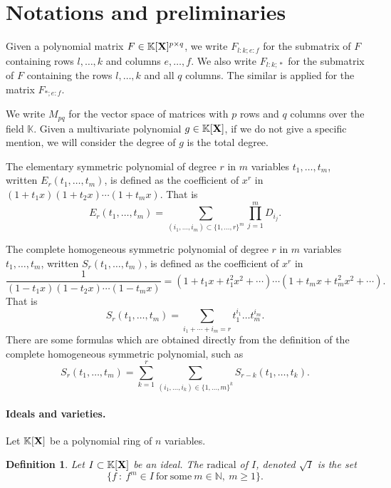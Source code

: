 \documentclass[11pt]{article}
\numberwithin{Property}{section}
\numberwithin{Theorem}{section}
\numberwithin{Proposition}{section}
\numberwithin{Lemma}{section}
\numberwithin{Corollary}{section}
\newtheorem{Definition}{Definition}%
\numberwithin{Definition}{section}
\numberwithin{Remark}{section}
\numberwithin{Conjecture}{section}
\numberwithin{Problem}{section}
\numberwithin{Claim}{section}
\theoremstyle{definition}
\numberwithin{Example}{section}
\renewcommand{\geq}{\geqslant}
\newcommand{\field}{\mathbb{K}} %
\newcommand{\mat}[1]{\mathbf{\MakeUppercase{#1}}} %
\newcommand{\todo}[1]{\textcolor{red}{#1}} %
\begin{document}
\section{Notations and preliminaries}
\label{sec:not}
Given a polynomial matrix $F \in \field[\mat{X}]^{p \times q}$, we write $F_{l:k \mathbf{;} e:f}$ for the submatrix of $F$ containing rows $l, \ldots, k$ and columns $e, \ldots, f$. We also write $F_{l:k \mathbf{;} *}$ for the submatrix of $F$ containing the rows $l, \ldots, k$ and all $q$ columns. The similar is applied for the matrix $F_{* \mathbf{;} e:f}$. 

We write $M_{pq}$ for the vector space of matrices with $p$ rows and $q$ columns over the field $\field$. Given a multivariate polynomial $g \in \field[\mat{X}]$, if we do not give a specific mention, we will consider the degree of $g$ is the total degree.  %

The elementary symmetric polynomial of degree $r$ in $m$ variables $t_1, \ldots, t_m$, written $E_{r}(t_1, \ldots, t_m)$, is defined as the coefficient of $x^r$ in $(1+t_1x)(1+t_2x)\cdots(1+t_mx)$. That is
\[E_{r}(t_1, \ldots, t_m) = \sum_{(i_1,\ldots,i_{m}) \subset \{1, \ldots, r\}^{m}}\prod_{j =1}^{m}D_{i_j}.\]

The complete homogeneous symmetric polynomial of degree $r$ in $m$ variables $t_1, \ldots, t_m$, written $S_{r}(t_1, \ldots, t_m)$, is defined as the coefficient of $x^{r}$ in $$\frac{1}{(1-t_1x)(1-t_2x)\cdots(1-t_mx)} = (1+t_1x + t_1^2x^2 + \cdots)\cdots(1+t_mx + t_m^2x^2 + \cdots).$$
That is 
\[
S_r(t_1, \ldots, t_m) = \sum_{i_1 + \cdots + i_m = r} t_1^{i_1}\ldots t_m^{i_m}. 
\]
There are some formulas which are obtained directly from the definition of the complete homogeneous symmetric polynomial, such as 
\[S_{r}(t_1, \ldots, t_m) =  \sum\limits_{k=1}^r\sum\limits_{(i_1, \ldots, i_k) \in \{1, \ldots, m\}^k}S_{r-k}(t_1, \ldots, t_k).\]

\paragraph{Ideals and varieties.} Let $\field[\mat{X}]$ be a polynomial ring of $n$ variables. 
\begin{Definition} Let $I \subset \field[\mat{X}]$ be an ideal. The $\mathrm{radical}$ of $I$, denoted $\sqrt{I}$ is the set 
\[
\{f \ : \ f^m \in I \ \mathrm{for \ some} \ m \in \mathbb{N}, \ m \geq 1\}.
\]
\end{Definition}
\end{document}
